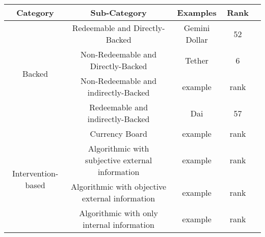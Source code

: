 \begin{table}[h!]
\centering

\begin{tabular}{|c|c|c|c|l|}

\hline
\rowcolor{LightSteelBlue}
\textbf{Category} & \textbf{Sub-Category}    					         & \textbf{Examples} & Rank \\  \hline

\multirow{4}{*}{Backed} 		                                                                 & Redeemable and Directly-Backed  & Gemini Dollar & 52 \\ \cline{2-2}
                                                                                                                 & Non-Redeemable and Directly-Backed  & Tether & 6 \\ \cline{2-2}
                                                                                                                 & Non-Redeemable and indirectly-Backed  & example & rank \\ \cline{2-2}
                                                                                                                 & Redeemable and indirectly-Backed & Dai & 57 \\  \hline
                                                                                                                 
                                                                                                                 
                                                                                                                 
                                                                                                                 
\multirow{4}{*}{Intervention-based}                                                           & Currency Board  & example & rank \\ \cline{2-2}
                                                                                                                 & Algorithmic with subjective external information  & example & rank \\ \cline{2-2}
                                                                                                                 & Algorithmic with objective external information  & example & rank \\ \cline{2-2}
                                                                                                                 & Algorithmic with only internal information & example & rank \\ \hline
                                                                                                                 

\end{tabular}
\end{table}
